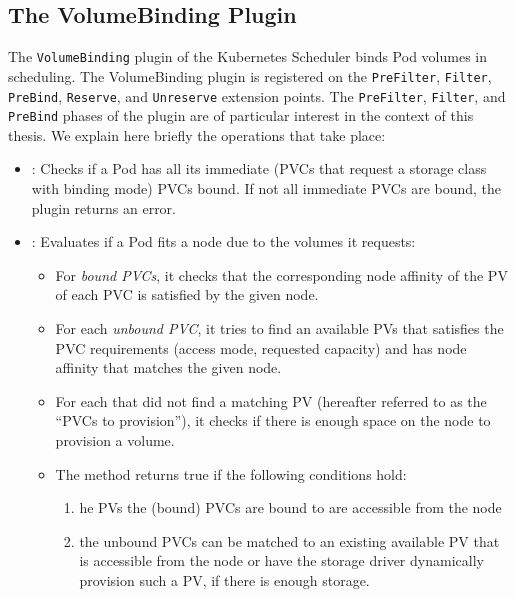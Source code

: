\subsection{The VolumeBinding Plugin}\label{section:background_volume_binding}

The \texttt{VolumeBinding} plugin of the Kubernetes Scheduler binds Pod volumes
in scheduling. The VolumeBinding plugin is registered on the \texttt{PreFilter},
\texttt{Filter}, \texttt{PreBind}, \texttt{Reserve}, and \texttt{Unreserve}
extension points. The \texttt{PreFilter}, \texttt{Filter}, and \texttt{PreBind}
phases of the plugin are of particular interest in the context of this thesis.
We explain here briefly the operations that take place:

\begin{itemize}
      \tightlist
      \item {}: Checks if a Pod has all its immediate (PVCs that
            request a storage class with  binding mode) PVCs
            bound. If not all immediate PVCs are bound, the plugin returns an
             error.
      \item {}:  Evaluates if a Pod fits a node due to the volumes it
            requests:
            \begin{itemize}
                  \tightlist
                  \item For \textit{bound PVCs}, it checks that the
                        corresponding node affinity of the PV of each PVC is
                        satisfied by the given node.
                  \item For each \textit{unbound PVC}, it tries to find an
                        available PVs that satisfies the PVC requirements
                        (access mode, requested capacity) and has node affinity
                        that matches the given node.
                  \item For each  that did not find a matching
                        PV (hereafter referred to as the ``PVCs to provision''),
                        it checks if there is enough space on the node to
                        provision a volume.


                  \item The  method returns true if the following
                        conditions hold:
                        \begin{enumerate}
                              \item  he PVs the (bound) PVCs are bound to are
                                    accessible from the node
                              \item the unbound PVCs can be matched to an
                                    existing available PV that is accessible
                                    from the node or  have the storage driver
                                    dynamically provision such a PV, if there is
                                    enough storage.
                        \end{enumerate}


\end{itemize}
\end{itemize}
